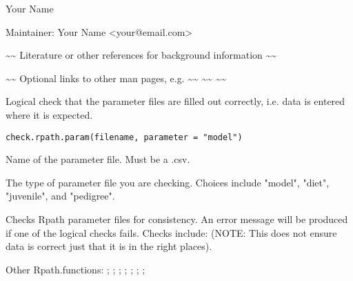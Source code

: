 \documentclass[a4paper]{book}
\begin{document}
%
\begin{Author}\relax
Your Name

Maintainer: Your Name <your@email.com>
\end{Author}
%
\begin{References}\relax
\textasciitilde{}\textasciitilde{} Literature or other references for background information \textasciitilde{}\textasciitilde{}
\end{References}
%
\begin{SeeAlso}\relax
\textasciitilde{}\textasciitilde{} Optional links to other man pages, e.g. \textasciitilde{}\textasciitilde{}
\textasciitilde{}\textasciitilde{}  \textasciitilde{}\textasciitilde{}
\end{SeeAlso}
%
\begin{Description}\relax
Logical check that the parameter files are filled out correctly, i.e. data is entered where it is
expected.
\end{Description}
%
\begin{Usage}
\begin{verbatim}
check.rpath.param(filename, parameter = "model")
\end{verbatim}
\end{Usage}
%
\begin{Arguments}
\begin{ldescription}
\item[\code{filename}] Name of the parameter file.  Must be a .csv.

\item[\code{parameter}] The type of parameter file you are checking.  Choices include "model",
"diet", "juvenile", and "pedigree".
\end{ldescription}
\end{Arguments}
%
\begin{Value}
Checks Rpath parameter files for consistency.  An error message will be produced if one of
the logical checks fails.  Checks include:
(NOTE: This does not ensure data is correct just that it is in the right places).
\end{Value}
%
\begin{SeeAlso}\relax
Other Rpath.functions: ;
; ;
; ;
; ;
\end{SeeAlso}
\end{document}
